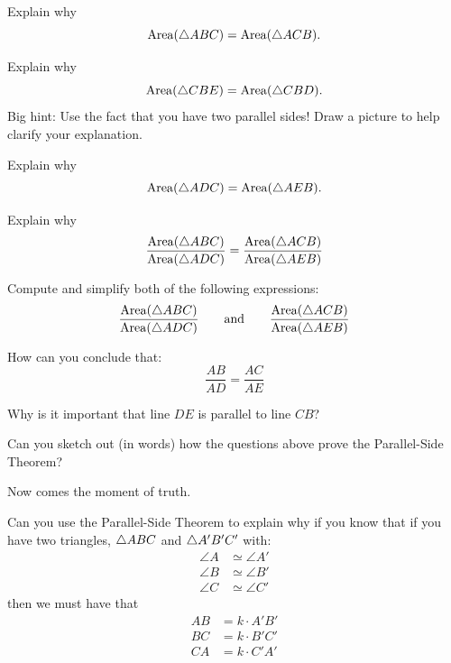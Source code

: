 \begin{question} Explain why 
\[
\mathrm{Area}(\triangle ABC) = \mathrm{Area}(\triangle ACB).
\]
\end{question}
\QM

\begin{question} Explain why 
\[
\mathrm{Area}(\triangle CBE) = \mathrm{Area}(\triangle CBD).
\]
Big hint: Use the fact that you have two parallel sides! Draw a
picture to help clarify your explanation.
\end{question}
\QM

\begin{question} Explain why 
\[
\mathrm{Area}(\triangle ADC)= \mathrm{Area}(\triangle AEB).
\]
\end{question}
\QM

\begin{question}
Explain why
\[
\frac{\mathrm{Area}(\triangle ABC)}{\mathrm{Area}(\triangle ADC)} = \frac{ \mathrm{Area}(\triangle ACB)}{\mathrm{Area}(\triangle AEB)}
\]
\end{question}
\QM

\begin{question} Compute and simplify both of the following expressions:
\[
\frac{\mathrm{Area}(\triangle ABC)}{\mathrm{Area}(\triangle ADC)} \qquad\text{and}\qquad\frac{ \mathrm{Area}(\triangle ACB)}{\mathrm{Area}(\triangle AEB)}
\]
\end{question}
\QM


\begin{question} How can you conclude that: 
\[
\frac{AB}{AD} = \frac{AC}{AE}
\]
\end{question}
\QM

\begin{question} 
Why is it important that line $DE$ is parallel to line $CB$?
\end{question}
\QM


\begin{question} 
Can you sketch out (in words) how the questions above prove the Parallel-Side
Theorem?
\end{question}
\QM

Now comes the moment of truth. 
\begin{question}
Can you use the Parallel-Side Theorem to explain why if you know that
if you have two triangles, $\triangle ABC$ and $\triangle A'B'C'$ with:
\begin{align*}
\angle A &\simeq \angle A'\\
\angle B &\simeq \angle B' \\
\angle C &\simeq \angle C'
\end{align*}
then we must have that
\begin{align*}
AB &= k\cdot A'B'\\
BC &= k\cdot B'C'\\
CA &= k\cdot C'A'
\end{align*}
\end{question}
\QM






